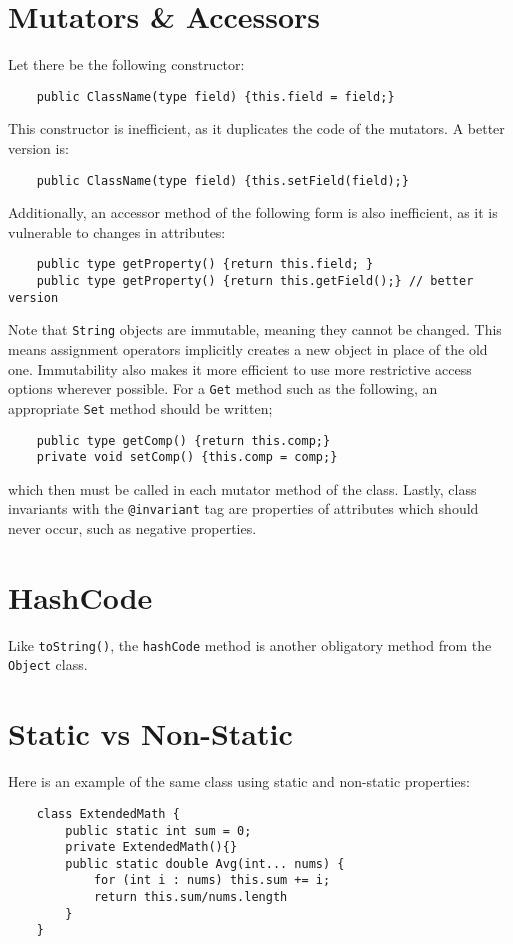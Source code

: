\documentclass[letterpaper, openany, justified]{tufte-book}
\newcommand{\cd}[1]{\lstinline{#1}}
\begin{document}
\begin{fullwidth}
\section{Mutators \& Accessors}
Let there be the following constructor:
\begin{lstlisting}
    public ClassName(type field) {this.field = field;}
\end{lstlisting}
This constructor is inefficient, as it duplicates the code of the mutators. A better version is:
\begin{lstlisting}
    public ClassName(type field) {this.setField(field);}
\end{lstlisting}
Additionally, an accessor method of the following form is also inefficient, as it is vulnerable to changes in attributes:
\begin{lstlisting}
    public type getProperty() {return this.field; }
    public type getProperty() {return this.getField();} // better version
\end{lstlisting}
Note that \cd{String} objects are immutable, meaning they cannot be changed. This means assignment operators implicitly creates a new object in place of the old one. Immutability also makes it more efficient to use more restrictive access options wherever possible. For a \cd{Get} method such as the following, an appropriate \cd{Set} method should be written;
\begin{lstlisting}
    public type getComp() {return this.comp;}
    private void setComp() {this.comp = comp;}
\end{lstlisting}
which then must be called in each mutator method of the class. Lastly, class invariants with the \cd{@invariant} tag are properties of attributes which should never occur, such as negative properties.

\section{HashCode}
Like \cd{toString()}, the \cd{hashCode} method is another obligatory method from the \cd{Object} class.

\section{Static vs Non-Static}
Here is an example of the same class using static and non-static properties:
\setlength{\columnseprule}{0.4pt}
\begin{multicols}{2}
\begin{lstlisting}
    class ExtendedMath {
        public static int sum = 0;
        private ExtendedMath(){}
        public static double Avg(int... nums) {
            for (int i : nums) this.sum += i;
            return this.sum/nums.length
        }
    }



\end{lstlisting}
\end{multicols}
\end{fullwidth}
\end{document}
